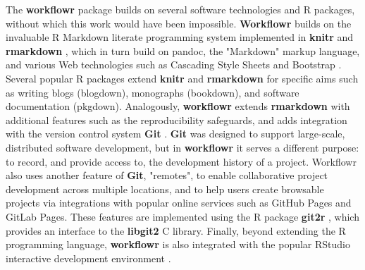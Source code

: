 \documentclass[9pt,a4paper]{extarticle}
\begin{document}
The \textbf{workflowr} package builds on several software technologies and R
packages, without which this work would have been impossible. \textbf{Workflowr}
builds on the invaluable R Markdown literate programming system
implemented in \textbf{knitr} \cite{Xie2014, knitrpkg} and \textbf{rmarkdown}
\cite{Xie2018, rmarkdownpkg}, which in turn build on pandoc, the
"Markdown" markup language, and various Web technologies such as
Cascading Style Sheets and Bootstrap \cite{Spurlock2013}. Several
popular R packages extend \textbf{knitr} and \textbf{rmarkdown} for specific aims such as
writing blogs (blogdown), monographs (bookdown), and software
documentation (pkgdown). Analogously, \textbf{workflowr} extends \textbf{rmarkdown} with
additional features such as the reproducibility safeguards, and adds
integration with the version control system \textbf{Git} \cite{Loeliger2012,
Chacon2014}. \textbf{Git} was designed to support large-scale, distributed
software development, but in \textbf{workflowr} it serves a different purpose: to
record, and provide access to, the development history of a project.
Workflowr also uses another feature of \textbf{Git}, "remotes", to enable
collaborative project development across multiple locations, and to help
users create browsable projects via integrations with popular online
services such as GitHub Pages and GitLab Pages. These features are
implemented using the R package \textbf{git2r} \cite{git2r}, which provides an
interface to the \textbf{libgit2} C library. Finally, beyond extending the R
programming language, \textbf{workflowr} is also integrated with the popular
RStudio interactive development environment \cite{rstudio}.
\end{document}
